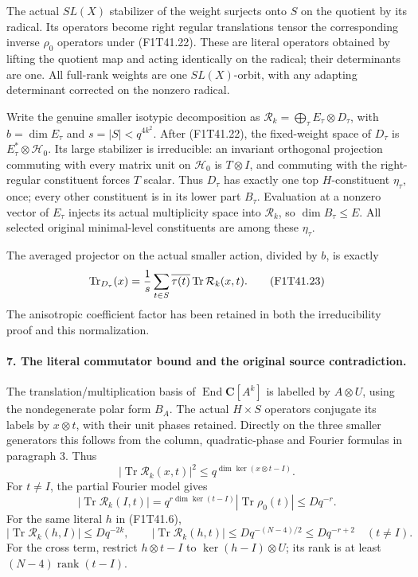 The actual \(SL(X)\) stabilizer of the weight
surjects onto \(S\) on the quotient by its radical.
Its operators become right regular translations
tensor the corresponding inverse \(\rho_0\)
operators under (F1T41.22). These are literal
operators obtained by lifting the quotient map
and acting identically on the radical; their
determinants are one. All full-rank weights
are one \(SL(X)\)-orbit, with any adapting
determinant corrected on the nonzero radical.

Write the genuine smaller isotypic decomposition as
\(\mathcal R_k=\bigoplus_\tau E_\tau\otimes D_\tau\),
with \(b=\dim E_\tau\) and \(s=|S|<q^{4k^2}\).
After (F1T41.22), the fixed-weight space of
\(D_\tau\) is \(E_\tau^*\otimes\mathcal H_0\).
Its large stabilizer is irreducible: an invariant
orthogonal projection commuting with every matrix
unit on \(\mathcal H_0\) is \(T\otimes I\),
and commuting with the right-regular constituent
forces \(T\) scalar. Thus \(D_\tau\) has exactly
one top \(H\)-constituent \(\eta_\tau\), once;
every other constituent is in its lower part
\(B_\tau\). Evaluation at a nonzero vector of
\(E_\tau\) injects its actual multiplicity space
into \(\mathcal R_k\), so \(\dim B_\tau\le E\).
All selected original minimal-level constituents
are among these \(\eta_\tau\).

The averaged projector on the actual smaller
action, divided by \(b\), is exactly
\[
 \operatorname{Tr}_{D_\tau}(x)
       ={1\over s}\sum_{t\in S}\overline{\tau(t)}
                               \operatorname{Tr}\mathcal R_k(x,t).
 \tag{F1T41.23}
\]
The anisotropic coefficient factor has been
retained in both the irreducibility proof and
this normalization.

\paragraph{7. The literal commutator bound and the original source contradiction.}
The translation/multiplication basis of
\(\operatorname{End}\mathbf C[A^k]\) is labelled
by \(A\otimes U\), using the nondegenerate
polar form \(B_A\). The actual \(H\times S\)
operators conjugate its labels by \(x\otimes t\),
with their unit phases retained. Directly on
the three smaller generators this follows from
the column, quadratic-phase and Fourier
formulas in paragraph 3. Thus
\[
       |\operatorname{Tr}\mathcal R_k(x,t)|^2
                   \le q^{\dim\ker(x\otimes t-I)}.
 \tag{F1T41.24}
\]
For \(t\ne I\), the partial Fourier model gives
\[
 |\operatorname{Tr}\mathcal R_k(I,t)|
   =q^{r\dim\ker(t-I)}|\operatorname{Tr}\rho_0(t)|
                             \le Dq^{-r}.
 \tag{F1T41.25}
\]
For the same literal \(h\) in (F1T41.6),
\[
 |\operatorname{Tr}\mathcal R_k(h,I)|\le Dq^{-2k},
 \qquad
 |\operatorname{Tr}\mathcal R_k(h,t)|
             \le Dq^{-(N-4)/2}\le Dq^{-r+2}\quad(t\ne I).
 \tag{F1T41.26}
\]
For the cross term, restrict \(h\otimes t-I\)
to \(\ker(h-I)\otimes U\); its rank is at least
\((N-4)\operatorname{rank}(t-I)\).

